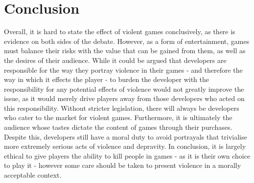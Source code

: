 \documentclass{scrartcl}
\begin{document}
	\section{Conclusion}
		Overall, it is hard to state the effect of violent games conclusively, as there is evidence on both sides of the debate. However, as a form of entertainment, games must balance their risks with the value that can be gained from them, as well as the desires of their audience. While it could be argued that developers are responsible for the way they portray violence in their games - and therefore the way in which it effects the player - to burden the developer with the responsibility for any potential effects of violence would not greatly improve the issue, as it would merely drive players away from those developers who acted on this responsibility. Without stricter legislation, there will always be developers who cater to the market for violent games. Furthermore, it is ultimately the audience whose tastes dictate the content of games through their purchases. Despite this, developers still have a moral duty to avoid portrayals that trivialise more extremely serious acts of violence and depravity. In conclusion, it is largely ethical to give players the ability to kill people in games - as it is their own choice to play it - however some care should be taken to present violence in a morally acceptable context.
	

	
	
	
\end{document}
